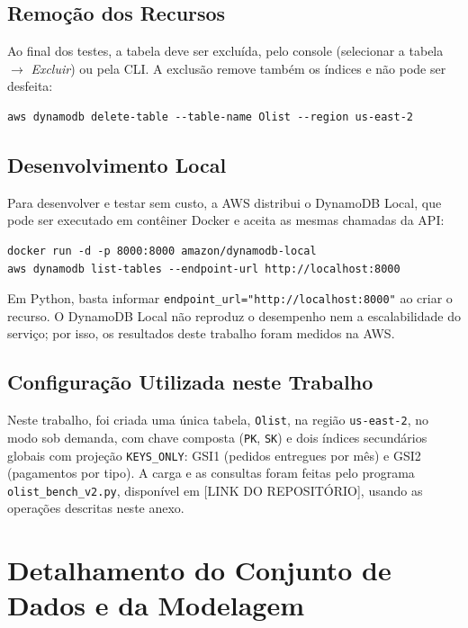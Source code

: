 \documentclass[12pt]{article}
\begin{document}
\subsection{Remoção dos Recursos}

Ao final dos testes, a tabela deve ser excluída, pelo console (selecionar a
tabela $\rightarrow$ \textit{Excluir}) ou pela CLI. A exclusão remove também
os índices e não pode ser desfeita:

{\footnotesize
\begin{verbatim}
aws dynamodb delete-table --table-name Olist --region us-east-2
\end{verbatim}
}

\subsection{Desenvolvimento Local}

Para desenvolver e testar sem custo, a AWS distribui o DynamoDB Local, que
pode ser executado em contêiner Docker e aceita as mesmas chamadas da API:

{\footnotesize
\begin{verbatim}
docker run -d -p 8000:8000 amazon/dynamodb-local
aws dynamodb list-tables --endpoint-url http://localhost:8000
\end{verbatim}
}

Em Python, basta informar \texttt{endpoint\_url="http://localhost:8000"} ao
criar o recurso. O DynamoDB Local não reproduz o desempenho nem a
escalabilidade do serviço; por isso, os resultados deste trabalho foram
medidos na AWS.

\subsection{Configuração Utilizada neste Trabalho}

Neste trabalho, foi criada uma única tabela, \texttt{Olist}, na região
\texttt{us-east-2}, no modo sob demanda, com chave composta
(\texttt{PK}, \texttt{SK}) e dois índices secundários globais com projeção
\texttt{KEYS\_ONLY}: GSI1 (pedidos entregues por mês) e GSI2 (pagamentos por
tipo). A carga e as consultas foram feitas pelo programa
\texttt{olist\_bench\_v2.py}, disponível em [LINK DO REPOSITÓRIO], usando as
operações descritas neste anexo.


\clearpage
\section{Detalhamento do Conjunto de Dados e da Modelagem}
\label{anexo:modelagem}
\end{document}
